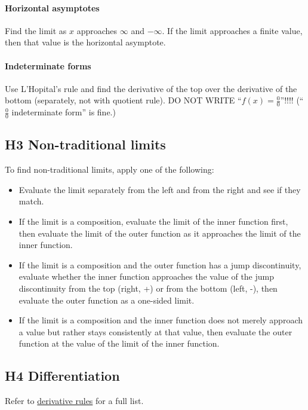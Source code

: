 \documentclass[letterpaper, 12pt]{article}
\begin{document}
\paragraph{Horizontal asymptotes} Find the limit as $x$ approaches $\infty$ and $-\infty$. If the limit approaches a finite value, then that value is the horizontal asymptote.

\paragraph{Indeterminate forms} Use L'Hopital's rule and find the derivative of the top over the derivative of the bottom (separately, not with quotient rule). DO NOT WRITE ``$f(x) = \frac{0}{0}$''!!!! (``$\frac{0}{0}$ indeterminate form'' is fine.)

\subsection*{H3 Non-traditional limits}

To find non-traditional limits, apply one of the following:

\begin{itemize}
\item Evaluate the limit separately from the left and from the right and see if they match.
\item If the limit is a composition, evaluate the limit of the inner function first, then evaluate the limit of the outer function as it approaches the limit of the inner function.
\item If the limit is a composition and the outer function has a jump discontinuity, evaluate whether the inner function approaches the value of the jump discontinuity from the top (right, +) or from the bottom (left, -), then evaluate the outer function as a one-sided limit.
\item If the limit is a composition and the inner function does not merely approach a value but rather stays consistently at that value, then evaluate the outer function at the value of the limit of the inner function.
\end{itemize}

\subsection*{H4 Differentiation}

Refer to \href{https://www.mathsisfun.com/calculus/derivatives-rules.html}{derivative rules} for a full list.
\end{document}
